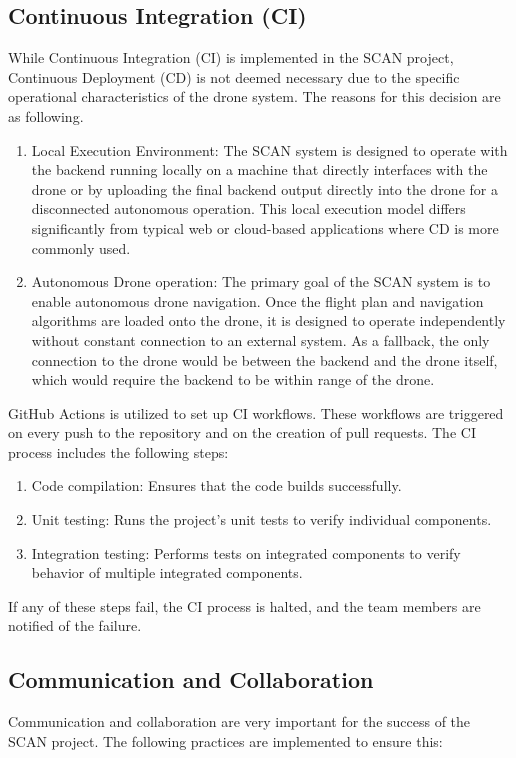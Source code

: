 \subsection{Continuous Integration (CI)}

While Continuous Integration (CI) is implemented in the SCAN project, Continuous Deployment (CD) is not deemed necessary due to the specific operational characteristics of the drone system. The reasons for this decision are as following.

\begin{enumerate}
    \item Local Execution Environment: The SCAN system is designed to operate with the backend running locally on a machine that directly interfaces with the drone or by uploading the final backend output directly into the drone for a disconnected autonomous operation. This local execution model differs significantly from typical web or cloud-based applications where CD is more commonly used.
    \item Autonomous Drone operation: The primary goal of the SCAN system is to enable autonomous drone navigation. Once the flight plan and navigation algorithms are loaded onto the drone, it is designed to operate independently without constant connection to an external system. As a fallback, the only connection to the drone would be between the backend and the drone itself, which would require the backend to be within range of the drone.
\end{enumerate}

GitHub Actions is utilized to set up CI workflows. These workflows are triggered on every push to the repository and on the creation of pull requests. The CI process includes the following steps:

\begin{enumerate}
    \item Code compilation: Ensures that the code builds successfully.
    \item Unit testing: Runs the project's unit tests to verify individual components.
    \item Integration testing: Performs tests on integrated components to verify behavior of multiple integrated components.
\end{enumerate}

If any of these steps fail, the CI process is halted, and the team members are notified of the failure. 

\subsection{Communication and Collaboration}
Communication and collaboration are very important for the success of the SCAN project. The following practices are implemented to ensure this:

